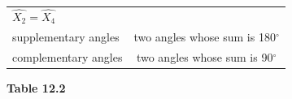 {{\begin{center}
\begin{tabular}[t]{|l|l|l|}
                  \begin{math}\hat{{X}_{2}}=\hat{{X}_{4}}\end{math}
     \tabularnewline\cline{1-1}\cline{2-2}\cline{3-3}
        supplementary angles &
    \multicolumn{2}{c|}{two angles whose sum is 180\begin{math}{}^{\circ }\end{math}}
     \tabularnewline\cline{1-1}\cline{2-2}\cline{3-3}
        complementary angles &
    \multicolumn{2}{c|}{two angles whose sum is 90\begin{math}{}^{\circ }\end{math}}
     \tabularnewline\cline{1-1}\cline{2-2}\cline{3-3}
    \end{tabular}
      \end{center}
    \begin{center}{\small\bfseries Table 12.2}\end{center}
          }{ %
        \begin{center}
      \label{m39370*id315548}
    \noindent
      \tablelasttail{}
      \begin{xtabular}[t]{|l|l|l|}\hline

\end{xtabular}
\end{center}}}
